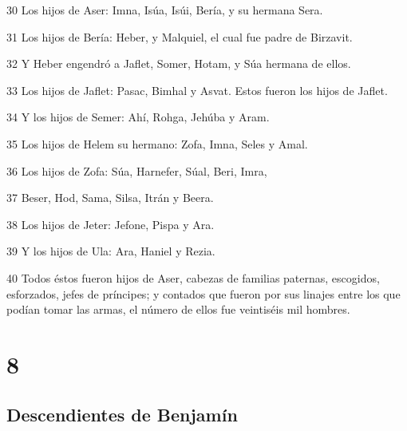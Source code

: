 \par 30 Los hijos de Aser: Imna, Isúa, Isúi, Bería, y su hermana Sera.
\par 31 Los hijos de Bería: Heber, y Malquiel, el cual fue padre de Birzavit.
\par 32 Y Heber engendró a Jaflet, Somer, Hotam, y Súa hermana de ellos.
\par 33 Los hijos de Jaflet: Pasac, Bimhal y Asvat. Estos fueron los hijos de Jaflet.
\par 34 Y los hijos de Semer: Ahí, Rohga, Jehúba y Aram.
\par 35 Los hijos de Helem su hermano: Zofa, Imna, Seles y Amal.
\par 36 Los hijos de Zofa: Súa, Harnefer, Súal, Beri, Imra,
\par 37 Beser, Hod, Sama, Silsa, Itrán y Beera.
\par 38 Los hijos de Jeter: Jefone, Pispa y Ara.
\par 39 Y los hijos de Ula: Ara, Haniel y Rezia.
\par 40 Todos éstos fueron hijos de Aser, cabezas de familias paternas, escogidos, esforzados, jefes de príncipes; y contados que fueron por sus linajes entre los que podían tomar las armas, el número de ellos fue veintiséis mil hombres.

\chapter{8}

\section*{Descendientes de Benjamín}

